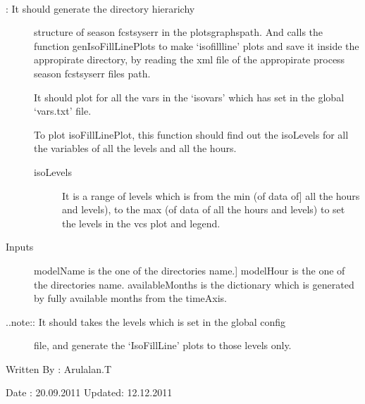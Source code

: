 \documentclass[letterpaper,10pt,english]{sphinxmanual}
\begin{document}

\begin{fulllineitems}
\label{diagnosis:generate_iso_plots.genSeasonFcstSysErrDirs}~\begin{description}
\item[{{\hyperref[diagnosis:generate_iso_plots.genSeasonFcstSysErrDirs]{}}: It should generate the directory hierarichy}] \leavevmode
structure of season fcstsyserr in the plotsgraphspath. And calls the
function genIsoFillLinePlots to make `isofillline' plots and save it
inside the appropirate directory, by reading the xml file of the
appropirate process season fcstsyserr files path.

It should plot for all the vars in the `isovars' which has set in the
global `vars.txt' file.

To plot isoFillLinePlot, this function should find out the isoLevels
for all the variables of all the levels and all the hours.
\begin{description}
\item[{isoLevels}] \leavevmode{[}It is a range of levels which is from the min (of data of{]}
all the hours and levels), to the max (of data of all the hours and
levels) to set the levels in the vcs plot and legend.

\end{description}

\item[{Inputs}] \leavevmode{[}modelName is the one of the directories name.{]}
modelHour is the one of the directories name.
availableMonths is the dictionary which is generated by fully
available months from the timeAxis.

\item[{..note:: It should takes the levels which is set in the global config}] \leavevmode
file, and generate the `IsoFillLine' plots to those levels only.

\end{description}

Written By : Arulalan.T

Date : 20.09.2011
Updated: 12.12.2011

\end{fulllineitems}

\end{document}
